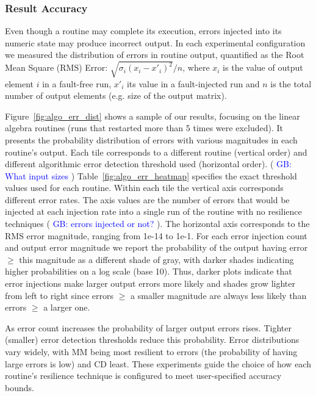 \documentclass[10pt, conference, compsocconf]{IEEEtran}
\newcommand{\greg}[1]{%
  \textcolor{blue}{GB: #1}
}
\begin{document}
\vspace{-10pt}
\subsubsection{Result Accuracy}
\vspace{-10pt}
\label{sec:res_tech:eval:accuracy}

Even though a routine may complete its execution, errors injected into its numeric state may produce incorrect output.
In each experimental configuration we measured the distribution of errors in routine output, quantified as the Root Mean Square (RMS) Error: $\sqrt{\sigma_i (x_i-x'_i)^2}/n$, where $x_i$ is the value of output element $i$ in a fault-free run, $x'_i$ its value in a fault-injected run and $n$ is the total number of output elements (e.g. size of the output matrix).

Figure~\ref{fig:algo_err_dist} shows a sample of our results, focusing on the linear algebra routines (runs that restarted more than 5 times were excluded).
It presents the probability distribution of errors with various magnitudes in each routine's output.
Each tile corresponds to a different routine (vertical order) and different algorithmic error detection threshold used (horizontal order). (\greg{What input sizes})
Table~\ref{fig:algo_err_heatmap} specifies the exact threshold values used for each routine.
Within each tile the vertical axis corresponds different error rates.
The axis values are the number of errors that would be injected at each injection rate into a single run of the routine with no resilience techniques (\greg{errors injected or not?}).
The horizontal axis corresponds to the RMS error magnitude, ranging from 1e-14 to 1e-1.
For each error injection count and output error magnitude we report the probability of the output having error $\ge$ this magnitude as a different shade of gray, with darker shades indicating higher probabilities on a log scale (base 10).
Thus, darker plots indicate that error injections make larger output errors more likely and shades grow lighter from left to right since errors $\ge$ a smaller magnitude are always less likely than errors $\ge$ a larger one.

As error count increases the probability of larger output errors rises.
Tighter (smaller) error detection thresholds reduce this probability.
Error distributions vary widely, with MM being most resilient to errors (the probability of having large errors is low) and CD least.
These experiments guide the choice of how each routine's resilience technique is configured to meet user-specified accuracy bounds.
\end{document}
